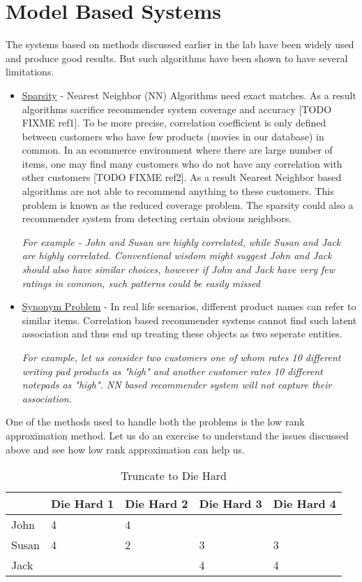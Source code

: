 \documentclass{article}
\begin{document}
  \section{Model Based Systems}
  The systems based on methods discussed earlier in the lab have been widely used and produce good results. But such algorithms have been shown to have several limitations. 
  \begin{itemize}
    \item \underline{Sparsity} - Nearest Neighbor (NN) Algorithms need exact matches. As a result algorithms sacrifice recommender system coverage and accuracy [TODO FIXME ref1]. To be more precise, correlation coefficient is only defined between customers who have few products (movies in our database) in common. In an ecommerce environment where there are large number of items, one may find many customers who do not have any correlation with other customers [TODO FIXME ref2]. As a result Nearest Neighbor based algorithms are not able to recommend anything to these customers. This problem is known as the reduced coverage problem. The sparsity could also a recommender system from detecting certain obvious neighbors. 

\textit{For example - John and Susan are highly correlated, while Susan and Jack are highly correlated. Conventional wisdom might suggest John and Jack should also have similar choices, however if John and Jack have very few ratings in common, such patterns could be easily missed}
    \item \underline{Synonym Problem} - In real life scenarios, different product names can refer to similar items. Correlation based recommender systems cannot find such latent association and thus end up treating these objects as two seperate entities. 

\textit{For example, let us consider two customers one of whom rates 10 different writing pad products as "high" and another customer rates 10 different notepads as "high". NN based recommender system will not capture their association.}
  \end{itemize}
  One of the methods used to handle both the problems is the low rank approximation method. Let us do an exercise to understand the issues discussed above and see how low rank approximation can help us. \\
  \begin{table}[]
  \centering
  \label{my-label}
  \begin{tabular}{|l|l|l|l|l|}
  \hline
      & Die Hard 1 & Die Hard 2 & Die Hard 3 & Die Hard 4 \\ \hline
John  & 4          & 4          &            &            \\ \hline
Susan & 4          & 2          & 3          & 3          \\ \hline
Jack  &            &            & 4          & 4          \\ \hline
  \end{tabular}
  \caption{Truncate to Die Hard}
  \label{Model-1}
  \end{table}
\end{document}
